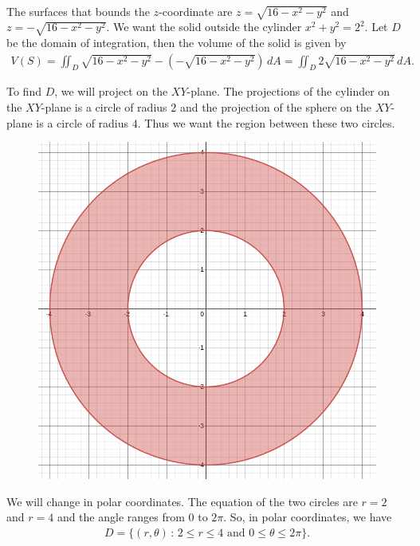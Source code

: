 	\spc 

	\\
	The surfaces that bounds the $z$-coordinate are $z = \sqrt{16 - x^2 - y^2}$ and $z = -\sqrt{16 - x^2 - y^2}$. We want the solid outside the cylinder $x^2 + y^2 = 2^2$. Let $D$ be the domain of integration, then the volume of the solid is given by
		\begin{align*}
		V(S) = \iint_D \sqrt{16 - x^2 - y^2} - (- \sqrt{16 - x^2 - y^2}) \, dA = \iint_D 2 \sqrt{16 - x^2 - y^2} \, dA .
		\end{align*}
	
	To find $D$, we will project on the $XY$-plane. The projections of the cylinder on the $XY$-plane is a circle of radius $2$ and the projection of the sphere on the $XY$-plane is a circle of radius $4$. Thus we want the region between these two circles.
		\begin{figure}[h]
		\centering
		\includegraphics[scale=0.3]{exo22_15-3.png}
		\end{figure}
	We will change in polar coordinates. The equation of the two circles are $r = 2$ and $r = 4$ and the angle ranges from $0$ to $2\pi$. So, in polar coordinates, we have
		\begin{align*}
		D = \{ (r, \theta ) \, : \, 2 \leq r \leq 4 \text{ and } 0 \leq \theta \leq 2\pi \} .
		\end{align*}
		
